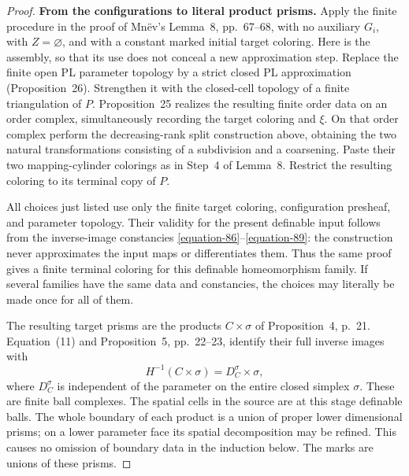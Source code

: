 \documentclass[11pt,a4paper]{article}
\theoremstyle{definition}
\begin{document}
\begin{proof}
\textbf{From the configurations to literal product prisms.}\quad
Apply the finite procedure in the proof of Mn\"ev's Lemma~8,
pp.~67--68, with no auxiliary \(G_i\), with \(Z=\varnothing\), and
with a constant marked initial target coloring.
Here is the assembly, so that its use does not conceal a new
approximation step. Replace the finite open PL parameter topology
by a strict closed PL approximation (Proposition~26). Strengthen it
with the closed-cell topology of a finite triangulation of \(P\).
Proposition~25 realizes the resulting finite order data on an order
complex, simultaneously recording the target coloring and \(\xi\).
On that order complex perform the decreasing-rank split construction
above, obtaining the two natural transformations consisting of a
subdivision and a coarsening. Paste their two mapping-cylinder
colorings as in Step~4 of Lemma~8. Restrict the resulting coloring
to its terminal copy of \(P\).

All choices just listed use only the finite target coloring,
configuration presheaf, and parameter topology. Their validity for
the present definable input follows from the inverse-image
constancies \eqref{equation-86}--\eqref{equation-89}: the construction never approximates
the input maps or differentiates them. Thus the same proof gives a
finite terminal coloring for this definable homeomorphism family.
If several families have the same data and constancies, the choices
may literally be made once for all of them.

The resulting target prisms are the products \(C\times\sigma\) of
Proposition~4, p.~21. Equation~(11) and Proposition~5, pp.~22--23,
identify their full inverse images with
\begin{equation}
 H^{-1}(C\times\sigma)=D_C^\sigma\times\sigma,
 \label{equation-90}
\end{equation}
where \(D_C^\sigma\) is independent of the parameter on the entire
closed simplex \(\sigma\). These are finite ball complexes.
The spatial cells in the source are at this stage definable balls.
The whole boundary of each product is a union of proper lower
dimensional prisms; on a lower parameter face its spatial
decomposition may be refined. This causes no omission of boundary
data in the induction below. The marks are unions of these prisms.


\end{proof}
\end{document}
